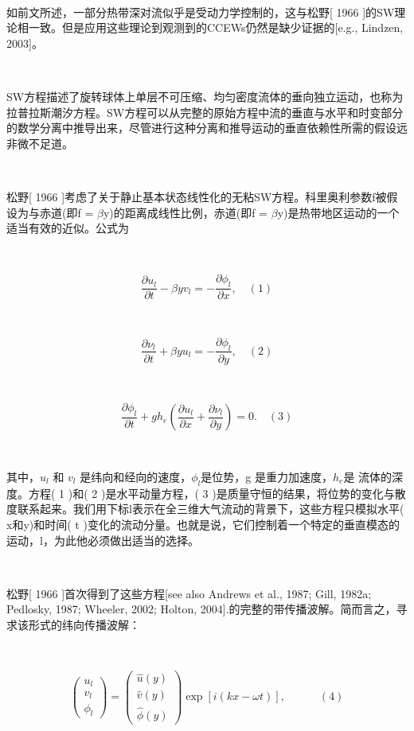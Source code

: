 \documentclass{article}
\begin{document}
\begin{CJK*}{UTF8}{gbsn}
\ 

如前文所述，一部分热带深对流似乎是受动力学控制的，这与松野[ 1966 ]的SW理论相一致。但是应用这些理论到观测到的CCEWs仍然是缺少证据的[e.g., Lindzen, 2003]。


\ 

SW方程描述了旋转球体上单层不可压缩、均匀密度流体的垂向独立运动，也称为拉普拉斯潮汐方程。SW方程可以从完整的原始方程中流的垂直与水平和时变部分的数学分离中推导出来，尽管进行这种分离和推导运动的垂直依赖性所需的假设远非微不足道。


\ 

松野[ 1966 ]考虑了关于静止基本状态线性化的无粘SW方程。科里奥利参数f被假设为与赤道(即f = $\beta$y)的距离成线性比例，赤道(即f = $\beta$y)是热带地区运动的一个适当有效的近似。公式为


\ 

\[\frac{\partial u_l}{\partial t} - \beta yv_l = - \frac{\partial \phi_l}{\partial x},\quad(1)
\]


\ 


\[ \frac{\partial\nu_l}{\partial t}+\beta yu_l=-\frac{\partial\phi_l}{\partial y},\quad(2)\]

\ 

\[ \frac{\partial\phi_l}{\partial t}+gh_e\left(\frac{\partial u_l}{\partial x}+\frac{\partial\nu_l}{\partial y}\right)=0.\quad(3) \]


\ 

其中，$u_l$ 和 $v_l$  是纬向和经向的速度，$\phi_l$是位势，g 是重力加速度，$h_e$是
流体的深度。方程( 1 )和( 2 )是水平动量方程，( 3 )是质量守恒的结果，将位势的变化与散度联系起来。我们用下标l表示在全三维大气流动的背景下，这些方程只模拟水平( x和y)和时间( t )变化的流动分量。也就是说，它们控制着一个特定的垂直模态的运动，l，为此他必须做出适当的选择。



\ 

松野[ 1966 ]首次得到了这些方程[see also Andrews et al., 1987; Gill, 1982a; Pedlosky, 1987; Wheeler, 2002; Holton, 2004].的完整的带传播波解。简而言之，寻求该形式的纬向传播波解：


\ 

\[\left.\left(\begin{array}{c}u_l\\v_l\\\phi_l\end{array}\right.\right)=\left(\begin{array}{c}\hat{u}(y)\\\hat{v}(y)\\\hat{\phi}(y)\end{array}\right)\exp[i(kx-\omega t)],\quad\quad\quad(4)\]



\end{CJK*}
\end{document}
